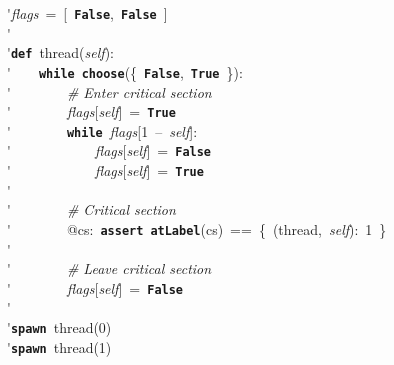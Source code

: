\'\>\textit{flags}~=~[~\texttt{\textbf{False}},~\texttt{\textbf{False}}~]\\

\'\>\\

\'\>\texttt{\textbf{def}}~thread(\textit{self}):\\

\'\>~~~~\texttt{\textbf{while}}~\texttt{\textbf{choose}}(\{~\texttt{\textbf{False}},~\texttt{\textbf{True}}~\}):\\

\'\>~~~~~~~~\emph{\# Enter critical section}\\

\'\>~~~~~~~~\textit{flags}[\textit{self}]~=~\texttt{\textbf{True}}\\

\'\>~~~~~~~~\texttt{\textbf{while}}~\textit{flags}[1~--~\textit{self}]:\\

\'\>~~~~~~~~~~~~\textit{flags}[\textit{self}]~=~\texttt{\textbf{False}}\\

\'\>~~~~~~~~~~~~\textit{flags}[\textit{self}]~=~\texttt{\textbf{True}}\\

\'\>~~~~~~~~\\

\'\>~~~~~~~~\emph{\# Critical section}\\

\'\>~~~~~~~~@cs:~\texttt{\textbf{assert}}~\texttt{\textbf{atLabel}}(cs)~==~\{~(thread,~\textit{self}):~1~\}\\

\'\>\\

\'\>~~~~~~~~\emph{\# Leave critical section}\\

\'\>~~~~~~~~\textit{flags}[\textit{self}]~=~\texttt{\textbf{False}}\\

\'\>\\

\'\>\texttt{\textbf{spawn}}~thread(0)\\

\'\>\texttt{\textbf{spawn}}~thread(1)